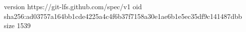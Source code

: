 version https://git-lfs.github.com/spec/v1
oid sha256:ad03757a164bb1cde4225a4c4f6b37f7158a30e1ae6b1e5ec35df9c141487dbb
size 1539
